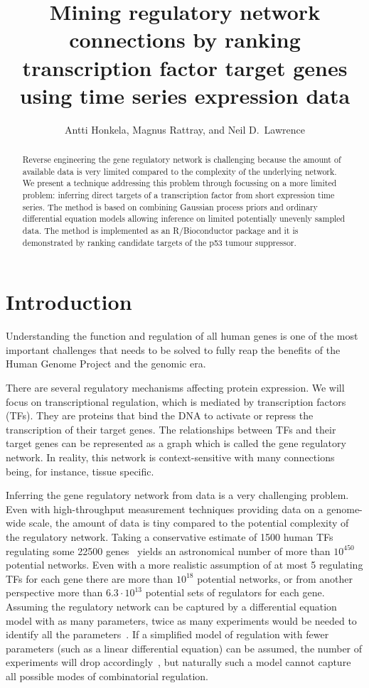 \documentclass[11pt]{article}
\title{Mining regulatory network connections by ranking transcription
  factor target genes using time series expression data}
\author{Antti Honkela, Magnus Rattray, and Neil D.\ Lawrence}
\begin{document}
\maketitle

\begin{abstract}
Reverse engineering the gene regulatory network is challenging because
the amount of available data is very limited compared to the
complexity of the underlying network.  We present a technique
addressing this problem through focussing on a more limited problem:
inferring direct targets of a transcription factor from short
expression time series.  The method is based on combining Gaussian
process priors and ordinary differential equation models allowing
inference on limited potentially unevenly sampled data.  The method is
implemented as an R/Bioconductor package and it is demonstrated by
ranking candidate targets of the p53 tumour suppressor.
\end{abstract}

\onehalfspacing

\section{Introduction}

Understanding the function and regulation of all human genes is one of
the most important challenges that needs to be solved to fully reap
the benefits of the Human Genome Project and the genomic era.

There are several regulatory mechanisms affecting protein expression.
We will focus on transcriptional regulation, which is mediated by
transcription factors (TFs).  They are proteins that bind the DNA to
activate or repress the transcription of their target genes.  The
relationships between TFs and their target genes can be represented as
a graph which is called the gene regulatory network.  In reality, this
network is context-sensitive with many connections being, for
instance, tissue specific.

Inferring the gene regulatory network from data is a very challenging
problem.  Even with high-throughput measurement techniques
providing data on a genome-wide scale, the amount of data is tiny
compared to the potential complexity of the regulatory network.
Taking a conservative estimate of 1500 human TFs~\cite{Vaquerizas2009}
regulating some 22500 genes~\cite{Pertea2010a} yields an astronomical
number of more than $10^{450}$ potential networks.  Even with a more
realistic assumption of at most 5 regulating TFs for each gene there
are more than $10^{18}$ potential networks, or from another
perspective more than $6.3 \cdot 10^{13}$ potential sets of regulators
for each gene.  Assuming the regulatory network can be captured by a
differential equation model with as many parameters, twice as many
experiments would be needed to identify all the
parameters~\cite{Sontag2002}.  If a simplified model of regulation
with fewer parameters (such as a linear differential equation) can be
assumed, the number of experiments will drop
accordingly~\cite{Stark2003}, but naturally such a model cannot
capture all possible modes of combinatorial regulation.
\end{document}
